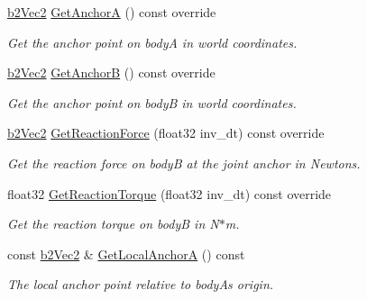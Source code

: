 \begin{DoxyCompactItemize}
\hyperlink{structb2Vec2}{b2\+Vec2} \hyperlink{classb2WheelJoint_a43a301e48ba486278932c82d3a98abd8}{Get\+AnchorA} () const override
\begin{DoxyCompactList}\small\item\em Get the anchor point on bodyA in world coordinates. \end{DoxyCompactList}\item 
\mbox{\label{classb2WheelJoint_a62f450ad368793c3cde36404a39775e0}} 
\hyperlink{structb2Vec2}{b2\+Vec2} \hyperlink{classb2WheelJoint_a62f450ad368793c3cde36404a39775e0}{Get\+AnchorB} () const override
\begin{DoxyCompactList}\small\item\em Get the anchor point on bodyB in world coordinates. \end{DoxyCompactList}\item 
\mbox{\label{classb2WheelJoint_a93e34e700ce794db1acee07562027b2a}} 
\hyperlink{structb2Vec2}{b2\+Vec2} \hyperlink{classb2WheelJoint_a93e34e700ce794db1acee07562027b2a}{Get\+Reaction\+Force} (float32 inv\+\_\+dt) const override
\begin{DoxyCompactList}\small\item\em Get the reaction force on bodyB at the joint anchor in Newtons. \end{DoxyCompactList}\item 
\mbox{\label{classb2WheelJoint_ad3317bb9856b105e4cb34d067316d7a8}} 
float32 \hyperlink{classb2WheelJoint_ad3317bb9856b105e4cb34d067316d7a8}{Get\+Reaction\+Torque} (float32 inv\+\_\+dt) const override
\begin{DoxyCompactList}\small\item\em Get the reaction torque on bodyB in N$\ast$m. \end{DoxyCompactList}\item 
\mbox{\label{classb2WheelJoint_aaf132c39227962a0b0788558e7dd6662}} 
const \hyperlink{structb2Vec2}{b2\+Vec2} \& \hyperlink{classb2WheelJoint_aaf132c39227962a0b0788558e7dd6662}{Get\+Local\+AnchorA} () const
\begin{DoxyCompactList}\small\item\em The local anchor point relative to bodyA\textquotesingle{}s origin. \end{DoxyCompactList}\item 

\end{DoxyCompactItemize}
